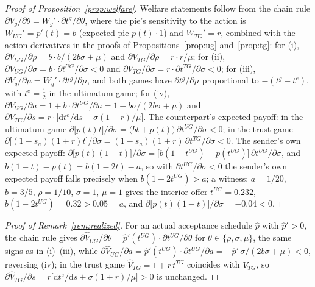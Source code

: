 \documentclass[11pt]{article}
\theoremstyle{plain}
\theoremstyle{remark}
\begin{document}
\begin{proof}[Proof of Proposition~\ref{prop:welfare}]
Welfare statements follow from the chain rule $\partial V_g/\partial\theta=W_g'\cdot\partial t^{g}/\partial\theta$, where the pie's sensitivity to the action is $W_{UG}'=p'(t)=b$ (expected pie $p(t)\cdot 1$) and $W_{TG}'=r$, combined with the action derivatives in the proofs of Propositions~\ref{prop:ug} and~\ref{prop:tg}: for (i), $\partial V_{UG}/\partial\rho=b\cdot b/(2b\sigma+\mu)$ and $\partial V_{TG}/\partial\rho=r\cdot r/\mu$; for (ii), $\partial V_{UG}/\partial\sigma=b\cdot\partial t^{UG}/\partial\sigma<0$ and $\partial V_{TG}/\partial\sigma=r\cdot\partial t^{TG}/\partial\sigma<0$; for (iii), $\partial V_g/\partial\mu=W_g'\cdot\partial t^{g}/\partial\mu$, and both games have $\partial t^{g}/\partial\mu$ proportional to $-(t^{g}-t^{e})$, with $t^{e}=\tfrac12$ in the ultimatum game; for (iv), $\partial V_{UG}/\partial a=1+b\cdot\partial t^{UG}/\partial a=1-b\sigma/(2b\sigma+\mu)$ and $\partial V_{TG}/\partial s=r\cdot\bigl[\mathrm{d}t^{e}/\mathrm{d}s+\sigma(1+r)/\mu\bigr]$. The counterpart's expected payoff: in the ultimatum game $\partial\bigl[p(t)t\bigr]/\partial\sigma=\bigl(bt+p(t)\bigr)\,\partial t^{UG}/\partial\sigma<0$; in the trust game $\partial\bigl[(1-s_a)(1+r)t\bigr]/\partial\sigma=(1-s_a)(1+r)\,\partial t^{TG}/\partial\sigma<0$. The sender's own expected payoff: $\partial\bigl[p(t)(1-t)\bigr]/\partial\sigma=\bigl[b(1-t^{UG})-p(t^{UG})\bigr]\,\partial t^{UG}/\partial\sigma$, and $b(1-t)-p(t)=b(1-2t)-a$, so with $\partial t^{UG}/\partial\sigma<0$ the sender's own expected payoff falls precisely when $b(1-2t^{UG})>a$; a witness: $a=1/20$, $b=3/5$, $\rho=1/10$, $\sigma=1$, $\mu=1$ gives the interior offer $t^{UG}=0.232$, $b(1-2t^{UG})=0.32>0.05=a$, and $\partial\bigl[p(t)(1-t)\bigr]/\partial\sigma=-0.04<0$.
\end{proof}

\begin{proof}[Proof of Remark~\ref{rem:realized}]
For an actual acceptance schedule $\hat p$ with $\hat p'>0$, the chain rule gives $\partial\hat V_{UG}/\partial\theta=\hat p'(t^{UG})\cdot\partial t^{UG}/\partial\theta$ for $\theta\in\{\rho,\sigma,\mu\}$, the same signs as in (i)--(iii), while $\partial\hat V_{UG}/\partial a=\hat p'(t^{UG})\cdot\partial t^{UG}/\partial a=-\hat p'\,\sigma/(2b\sigma+\mu)<0$, reversing (iv); in the trust game $\hat V_{TG}=1+r\,t^{TG}$ coincides with $V_{TG}$, so $\partial\hat V_{TG}/\partial s=r\bigl[\mathrm{d}t^{e}/\mathrm{d}s+\sigma(1+r)/\mu\bigr]>0$ is unchanged.
\end{proof}
\end{document}
